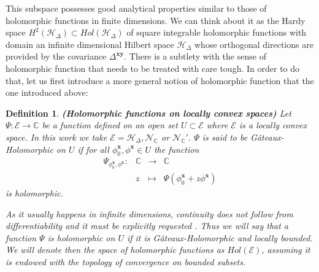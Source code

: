 \documentclass{elsarticle}%
\newtheorem{definition}{Definition}%
\begin{document}
 
 This subspace possesses good analytical properties similar to those of holomorphic functions in finite dimensions. We can think about it as the Hardy space $H^2(\mathcal{H}_\Delta)\subset Hol(\mathcal{H}_\Delta)$  of square integrable holomorphic functions with domain an infinite dimensional Hilbert space $\mathcal{H}_\Delta$ whose orthogonal directions are provided by the covariance $\Delta^{\mathbf{xy}}$.
 There is a subtlety  with the sense of holomorphic function  that needs to be treated with care tough.  In order to do that, let us first introduce a more general notion of holomorphic function that the one introduced above: 
\begin{definition}
    \label{def:Holomorphic}\textbf{(Holomorphic functions on locally convex spaces)}
    Let $\Psi:\mathcal{E}\to\mathbb{C}$ be a function defined on an open set $U\subset \mathcal{E}$ where $\mathcal{E}$ is a locally convex space. In this work we take $\mathcal{E}= \mathcal{H}_\Delta, \mathcal{N}_{\mathbb{C}}$ or $\mathcal{N}_{\mathbb{C}}'$.  $\Psi$ is said to be Gâteaux-Holomorphic on $U$ if for all $\phi^\mathbf{x}_0,\phi^\mathbf{x}\in U$ the function
    \begin{equation}
    \label{eq:complexSubfunctionGateaux}
    \begin{array}{rccc}
        \Psi_{\phi^\mathbf{x}_0,\phi^\mathbf{x}}:&\mathbb{C}&\longrightarrow&\mathbb{C}\\
         & z & \longmapsto & \Psi(\phi^\mathbf{x}_0+z\phi^\mathbf{x})
    \end{array}
    \end{equation} 
    is holomorphic. 

    As it usually happens in infinite dimensions, continuity does not follow from differentiability and  it must be explicitly requested \cite{dineenComplexAnalysis1981}. Thus we will say that a function  $\Psi$ is  holomorphic on $U$ if it is Gâteaux-Holomorphic and locally bounded. We will denote then the     space of holomorphic functions as $Hol(\mathcal{E})$, assuming it is endowed with the topology of convergence on bounded subsets.
    \end{definition}
\end{document}
